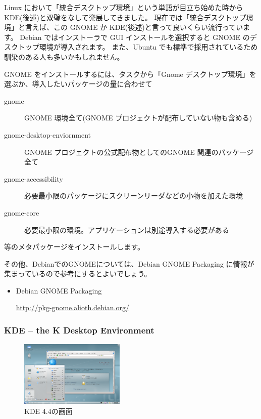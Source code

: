 \documentclass[mingoth,a4paper]{jsarticle}
\begin{document}
Linux において「統合デスクトップ環境」という単語が目立ち始めた時から KDE(後述)と双璧をなして発展してきました。
現在では「統合デスクトップ環境」と言えば、この GNOME か KDE(後述)と言って良いくらい流行っています。
Debian ではインストーラで GUI インストールを選択すると GNOME のデスクトップ環境が導入されます。
また、Ubuntu でも標準で採用されているため馴染のある人も多いかもしれません。

GNOME をインストールするには、タスクから「Gnome デスクトップ環境」を選ぶか、導入したいパッケージの量に合わせて
\begin{description}
      \item[gnome] 
    GNOME 環境全て(GNOME プロジェクトが配布していない物も含める)
      \item[gnome-desktop-enviornment]
    GNOME プロジェクトの公式配布物としてのGNOME 関連のパッケージ全て
      \item[gnome-accessibility]
    必要最小限のパッケージにスクリーンリーダなどの小物を加えた環境
      \item[gnome-core]
    必要最小限の環境。アプリケーションは別途導入する必要がある
\end{description}
等のメタパッケージをインストールします。

その他、DebianでのGNOMEについては、Debian GNOME Packaging に情報が集まっているので参考にするとよいでしょう。

\begin{itemize}
 \item Debian GNOME Packaging

       \url{http://pkg-gnome.alioth.debian.org/}

\end{itemize}


\subsubsection{KDE -- the K Desktop Environment}
\begin{figure}
 \begin{center}
  \includegraphics[width=5cm]{image201004/kde44.png}
  \caption{KDE 4.4の画面}
 \end{center}
\end{figure}
\end{document}
